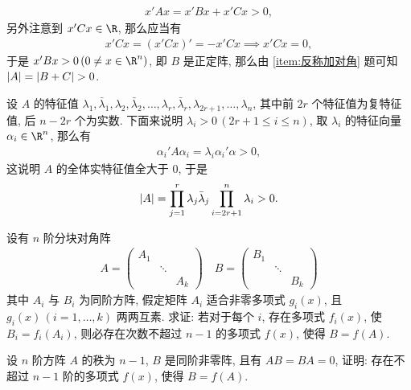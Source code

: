 \begin{exercise}[series=exer]
\begin{answer}
\begin{method}
\begin{align*}
              x'Ax = x'Bx + x'Cx > 0,
          \end{align*}
          另外注意到 $ x'Cx\in \R $, 那么应当有
          \begin{align*}
              x'Cx = (x'Cx)' = -x'Cx \implies x'Cx = 0,
          \end{align*}
          于是 $ x'Bx > 0\,(0 \ne x \in \R^{n}) $, 即 $ B $ 是正定阵, 那么由 \ref{item:反称加对角} 题可知 $ \abs{A} = \abs{B + C} > 0 $.
          \item 设 $ A $ 的特征值 $ \lambda_{1}, \bar{\lambda}_{1}, \lambda_{2}, \bar{\lambda}_{2}, \dots, \lambda_{r}, \bar{\lambda}_{r}, \lambda_{2r + 1}, \dots, \lambda_{n} $, 其中前 $ 2r $ 个特征值为复特征值, 后 $ n - 2r $ 个为实数. 下面来说明 $ \lambda_{i} > 0\,(2r + 1 \le i \le n) $, 取 $ \lambda_{i} $ 的特征向量 $ \alpha_{i} \in \R^{n} $, 那么有
          \begin{align*}
              \alpha_{i}'A\alpha_{i} = \lambda_{i}\alpha_{i}'\alpha > 0,
          \end{align*}
          这说明 $ A $ 的全体实特征值全大于 $ 0 $, 于是
          \begin{align*}
              \abs{A} = \prod_{j = 1}^{r}\lambda_{j}\bar{\lambda}_{j}\prod_{i = 2r + 1}^{n} \lambda_{i} > 0.
          \end{align*}
      \end{method}
  \end{answer}
  \item 设有 $ n $ 阶分块对角阵
  \begin{align*}
      A = \begin{pmatrix}
          A_{1} & & \\
          & \ddots & \\
          & & A_{k}
      \end{pmatrix}\quad
      B = \begin{pmatrix}
          B_{1} & & \\
          & \ddots & \\
          & & B_{k}
      \end{pmatrix}
  \end{align*}
  其中 $ A_{i} $ 与 $ B_{i} $ 为同阶方阵, 假定矩阵 $ A_{i} $ 适合非零多项式 $ g_{i}(x) $, 且 $ g_{i}(x)\,(i = 1, \dots, k) $ 两两互素. 求证: 若对于每个 $ i $, 存在多项式 $ f_{i}(x) $, 使 $ B_{i} = f_{i}(A_{i}) $, 则必存在次数不超过 $ n-1 $ 的多项式 $ f(x) $, 使得 $ B = f(A) $.
  \item 设 $ n $ 阶方阵 $ A $ 的秩为 $ n-1 $, $ B $ 是同阶非零阵, 且有 $ AB = BA = 0 $, 证明: 存在不超过 $ n-1 $ 阶的多项式 $ f(x) $, 使得 $ B = f(A) $.

\end{exercise}
